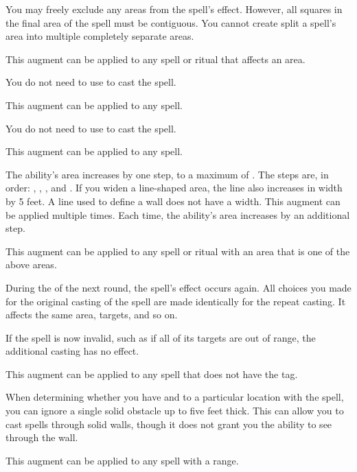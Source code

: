              You may freely exclude any areas from the spell's effect.
            However, all squares in the final area of the spell must be contiguous.
            You cannot create split a spell's area into multiple completely separate areas.
            \par This augment can be applied to any spell or ritual that affects an area.

             You do not need to use  to cast the spell.
            \par This augment can be applied to any spell.

             You do not need to use  to cast the spell.
            \par This augment can be applied to any spell.

             The ability's area increases by one step, to a maximum of \areahuge.
            The steps are, in order: \areasmall, \areamed, \arealarge, and \areahuge.
            If you widen a line-shaped area, the line also increases in width by 5 feet.
            A line used to define a wall does not have a width.
            This augment can be applied multiple times.
            Each time, the ability's area increases by an additional step.
            \par This augment can be applied to any spell or ritual with an area that is one of the above areas.

             During the  of the next round, the spell's effect occurs again.
            All choices you made for the original casting of the spell are made identically for the repeat casting.
            It affects the same area, targets, and so on.

            If the spell is now invalid, such as if all of its targets are out of range, the additional casting has no effect.
            \par This augment can be applied to any spell that does not have the  tag.

             When determining whether you have  and  to a particular location with the spell, you can ignore a single solid obstacle up to five feet thick.
            This can allow you to cast spells through solid walls, though it does not grant you the ability to see through the wall.
            \par This augment can be applied to any spell with a range.

